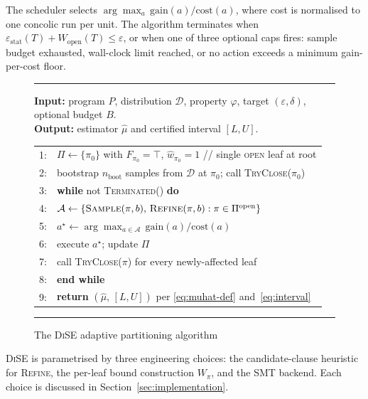 \documentclass[runningheads]{llncs}
\providecommand{\Cref}[1]{Section~\ref{#1}}
\newcommand{\dist}{\mathcal{D}}
\newcommand{\prog}{P}
\newcommand{\prop}{\varphi}
\newcommand{\muhat}{\hat{\mu}}
\newcommand{\partset}{\Pi}
\newcommand{\openleaves}{\partset^{\mathrm{open}}}
\newcommand{\Wopen}{W_{\mathrm{open}}}
\newcommand{\epsstat}{\varepsilon_{\mathrm{stat}}}
\newcommand{\hwhat}{\hat{w}}
\newcommand{\toolname}{\textsc{DiSE}}
\begin{document}
The scheduler selects $\arg\max_a\,\mathrm{gain}(a)/\mathrm{cost}(a)$,
where cost is normalised to one concolic run per unit.  The algorithm
terminates when $\epsstat(T) + \Wopen(T) \le \varepsilon$, or when
one of three optional caps fires: sample budget exhausted, wall-clock
limit reached, or no action exceeds a minimum gain-per-cost floor.

\begin{figure}[t]
  \caption{The \toolname{} adaptive partitioning algorithm}
  \label{alg:asip}
  \hrule\vspace{0.4em}
  \textbf{Input:} program $\prog$, distribution $\dist$, property
    $\prop$, target $(\varepsilon, \delta)$, optional budget $B$.\\
  \textbf{Output:} estimator $\muhat$ and certified interval $[L,U]$.
  \begin{flushleft}
  \begin{tabular}{rl}
    1: & $\partset \gets \{\pi_0\}$ with $F_{\pi_0} = \top$,
         $\hwhat_{\pi_0} = 1$ \hspace{1.5em}// single \textsc{open}
         leaf at root\\
    2: & bootstrap $n_{\mathrm{boot}}$ samples from $\dist$ at
         $\pi_0$;\; call \textsc{TryClose}($\pi_0$)\\
    3: & \textbf{while} not \textsc{Terminated}() \textbf{do}\\
    4: & \quad $\mathcal{A} \gets
         \{\textsc{Sample}(\pi,b),\,\textsc{Refine}(\pi,b)
           : \pi \in \openleaves\}$\\
    5: & \quad $a^\star \gets
         \arg\max_{a \in \mathcal{A}}\,\mathrm{gain}(a)/\mathrm{cost}(a)$\\
    6: & \quad execute $a^\star$;\; update $\partset$\\
    7: & \quad call \textsc{TryClose}($\pi$) for every newly-affected
         leaf\\
    8: & \textbf{end while}\\
    9: & \textbf{return} $(\muhat,\,[L,U])$ per
         \eqref{eq:muhat-def} and~\eqref{eq:interval}\\
  \end{tabular}
  \end{flushleft}
  \vspace{0.2em}\hrule
\end{figure}

\toolname{} is parametrised by three engineering choices: the
candidate-clause heuristic for \textsc{Refine}, the per-leaf bound
construction $W_\pi$, and the SMT backend.  Each choice is discussed
in \Cref{sec:implementation}.
\end{document}
